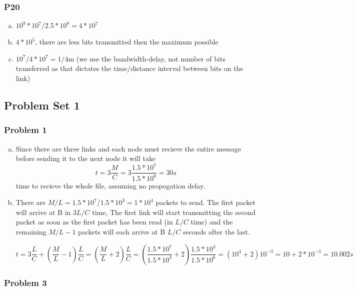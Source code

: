 \documentclass[11pt]{article}
\begin{document}
\subsubsection{P20}

\begin{enumerate}[(a)]
    \item $10^9 * 10^7 / 2.5*10^8 = 4*10^7$
    \item $4*10^5$, there are less bits transmitted then the maximum possible
    \item $10^7/4*10^7 = 1/4$m (we use the bandwidth-delay, not number of bits transferred as that dictates the time/distance interval between bits on the link)
\end{enumerate}

\subsection{Problem Set 1}

\subsubsection{Problem 1}

\begin{enumerate}[(a)]
    \item Since there are three links and each node must recieve the entire message before sending it to the next node it will take  \[ t = 3 \dfrac{M}{C} = 3 \dfrac{1.5*10^7}{1.5*10^6} = 30s \] time to recieve the whole file, assuming no propogation delay.
    \item There are $M/L = 1.5*10^7/1.5*10^3 = 1*10^4$ packets to send. The first packet will arrive at B in $3L/C$ time, The first link will start transmitting the second packet as soon as the first packet has been read (in $L/C$ time) and the remaining $M/L - 1$ packets will each arrive at B $L/C$ seconds after the last.
    
    \[ t = 3 \dfrac{L}{C} + \left(\dfrac{M}{L} - 1\right) \dfrac{L}{C} = \left(\dfrac{M}{L} + 2\right) \dfrac{L}{C} = \left(\dfrac{1.5*10^7}{1.5*10^3} + 2\right) \dfrac{1.5*10^3}{1.5*10^6} = (10^4 + 2) 10^{-3} = 10 + 2 * 10^{-3} = 10.002s \]
\end{enumerate}

\subsubsection{Problem 3}
\end{document}
